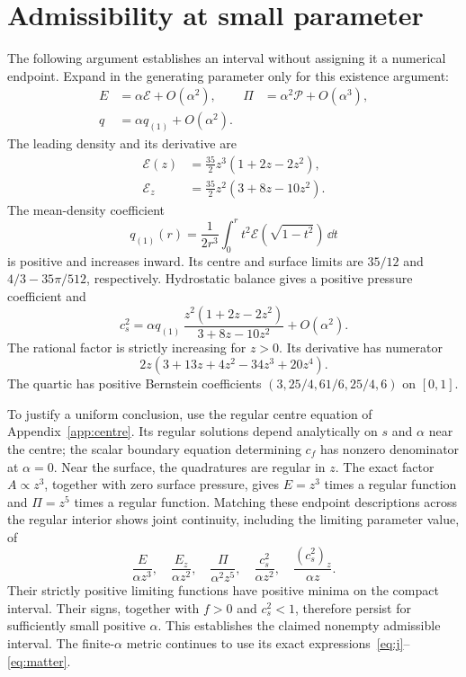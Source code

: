 \section{Admissibility at small parameter}
\label{app:admissibility}
The following argument establishes an interval without assigning it a numerical endpoint. Expand in the generating parameter only for this existence argument:
\begin{align}
 E&=\alpha\mathcal E+O(\alpha^2),&
 \Pi&=\alpha^2\mathcal P+O(\alpha^3),\nonumber\\
 q&=\alpha q_{(1)}+O(\alpha^2).
\end{align}
The leading density and its derivative are
\begin{align}
 \mathcal E(z)&=\tfrac{35}{2}z^3(1+2z-2z^2),\nonumber\\
 \mathcal E_z&=\tfrac{35}{2}z^2(3+8z-10z^2).
\end{align}
The mean-density coefficient
\begin{equation}
 q_{(1)}(r)=\frac1{2r^3}\int_0^r t^2\mathcal E(\sqrt{1-t^2})\,\dd t
\end{equation}
is positive and increases inward. Its centre and surface limits are $35/12$ and $4/3-35\pi/512$, respectively. Hydrostatic balance gives a positive pressure coefficient and
\begin{equation}
 c_s^2=\alpha q_{(1)}\,
 \frac{z^2(1+2z-2z^2)}{3+8z-10z^2}+O(\alpha^2).
\end{equation}
The rational factor is strictly increasing for $z>0$. Its derivative has numerator
\begin{equation}
 2z(3+13z+4z^2-34z^3+20z^4).
\end{equation}
The quartic has positive Bernstein coefficients
$(3,25/4,61/6,25/4,6)$ on $[0,1]$.

To justify a uniform conclusion, use the regular centre equation of Appendix~\ref{app:centre}. Its regular solutions depend analytically on $s$ and $\alpha$ near the centre; the scalar boundary equation determining $c_f$ has nonzero denominator at $\alpha=0$. Near the surface, the quadratures are regular in $z$. The exact factor $A\propto z^3$, together with zero surface pressure, gives $E=z^3$ times a regular function and $\Pi=z^5$ times a regular function. Matching these endpoint descriptions across the regular interior shows joint continuity, including the limiting parameter value, of
\begin{equation}
 \frac{E}{\alpha z^3},\quad
 \frac{E_z}{\alpha z^2},\quad
 \frac{\Pi}{\alpha^2z^5},\quad
 \frac{c_s^2}{\alpha z^2},\quad
 \frac{(c_s^2)_z}{\alpha z}.
\end{equation}
Their strictly positive limiting functions have positive minima on the compact interval. Their signs, together with $f>0$ and $c_s^2<1$, therefore persist for sufficiently small positive $\alpha$. This establishes the claimed nonempty admissible interval. The finite-$\alpha$ metric continues to use its exact expressions~\eqref{eq:j}--\eqref{eq:matter}.


